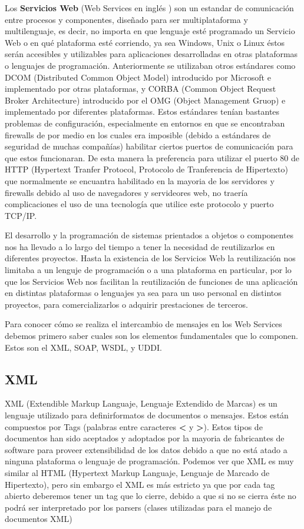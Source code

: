 \documentclass[12pt,letterpaper,titlepage]{article}
\begin{document}
Los \textbf{Servicios Web} (Web Services en inglés ) son un estandar de comunicación entre procesos y componentes, diseñado para ser multiplataforma y multilenguaje, es decir, no importa en que lenguaje esté programado un Servicio Web o en qué plataforma esté corriendo, ya sea Windows, Unix o Linux éstos serán accesibles y utilizables para aplicaciones desarrolladas en otras plataformas o lenguajes de programación. Anteriormente se utilizaban otros estándares como DCOM (Distributed Common Object Model) introducido por Microsoft e implementado por otras plataformas, y CORBA (Common Object Request Broker Architecture) introducido por el OMG (Object Management Gruop) e implementado por diferentes plataformas. Estos estándares tenían bastantes problemas de configuración, especialmente en entornos en que se encontraban firewalls de por medio en los cuales era imposible (debido a estándares de seguridad de muchas compañías) habilitar ciertos puertos de comunicación para que estos funcionaran. De esta manera la preferencia para utilizar el puerto 80 de HTTP (Hypertext Tranfer Protocol, Protocolo de Tranferencia de Hipertexto) que normalmente se encuantra habilitado en la mayoria de los servidores y firewalls debido al uso de navegadores y servideores web, no traería complicaciones el uso de una tecnología que utilice este protocolo y puerto TCP/IP.

El desarrollo y la programación de sistemas prientados a objetos o componentes nos ha llevado a lo largo del tiempo a tener la necesidad de reutilizarlos en diferentes proyectos. Hasta la existencia de los Servicios Web la reutilización nos limitaba a un lenguje de programación o a una plataforma en particular, por lo que los Servicios Web nos facilitan la reutilización de funciones de una aplicación en distintas plataformas o lenguajes ya sea para un uso personal en distintos proyectos, para comercializarlos o adquirir prestaciones de terceros. \cite{134}

Para conocer cómo se realiza el intercambio de mensajes en los Web Services debemos primero saber cuales son los elementos fundamentales que lo componen. Estos son el XML, SOAP, WSDL, y UDDI.

\subsection{XML}\label{xml}
XML (Extendible Markup Languaje, Lenguaje Extendido de Marcas) es un lenguaje utilizado para definirformatos de documentos o mensajes. Estos están compuestos por Tags (palabras entre caracteres \textbf{<} y \textbf{>}). Estos tipos de documentos han sido aceptados y adoptados por la mayoria de fabricantes de software para proveer extensibilidad de los datos debido a que no está atado a ninguna plataforma o lenguaje de programación. Podemos ver que XML es muy similar al HTML (Hypertext Markup Languaje, Lenguaje de Marcado de Hipertexto), pero sin embargo el XML es más estricto ya que por cada tag abierto deberemos tener un tag que lo cierre, debido a que si no se cierra éste no podrá ser interpretado por los parsers (clases utilizadas para el manejo de documentos XML)
\end{document}

